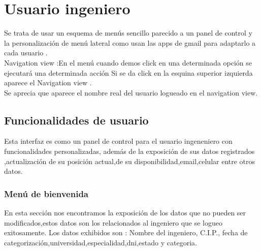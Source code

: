 \chapter{Usuario ingeniero}
Se trata de usar un esquema de men\'us sencillo parecido a un panel de control  y la personalizaci\'on de men\'u lateral como usan las apps de gmail para adaptarlo a cada usuario .\\
Navigation view :En el men\'u cuando demos click en una determinada opci\'on se ejecutar\'a una determinada acci\'on 
Si se da click en la esquina   superior izquierda aparece el Navigation view .\\
Se aprecia que aparece el nombre real del usuario logueado en el navigation view.
\section{Funcionalidades de usuario}
Esta interfaz es como un panel de control para el usuario ingeneniero con funcionalidades personalizadas, adem\'as de la exposici\'on de sus datos registrados ,actualizaci\'on de su posici\'on actual,de su disponibilidad,email,celular entre otros datos.
\subsection{Men\'u de bienvenida}
En esta secci\'on nos encontramos la exposici\'on de los datos que no pueden ser modificados,estos datos son los relacionados al ingeniero que se logueo exitosamente.
Los datos exhibidos son : Nombre del ingeniero, C.I.P., fecha de categorizaci\'on,universidad,especialidad,dni,estado y categoria.
